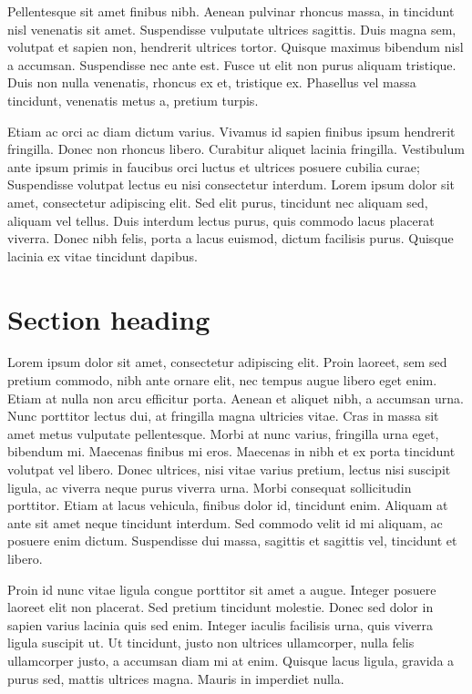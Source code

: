 \documentclass[a4paper, 11pt]{report}
\begin{document}
Pellentesque sit amet finibus nibh. Aenean pulvinar rhoncus massa, in tincidunt nisl venenatis sit amet. Suspendisse vulputate ultrices sagittis. Duis magna sem, volutpat et sapien non, hendrerit ultrices tortor. Quisque maximus bibendum nisl a accumsan. Suspendisse nec ante est. Fusce ut elit non purus aliquam tristique. Duis non nulla venenatis, rhoncus ex et, tristique ex. Phasellus vel massa tincidunt, venenatis metus a, pretium turpis.

Etiam ac orci ac diam dictum varius. Vivamus id sapien finibus ipsum hendrerit fringilla. Donec non rhoncus libero. Curabitur aliquet lacinia fringilla. Vestibulum ante ipsum primis in faucibus orci luctus et ultrices posuere cubilia curae; Suspendisse volutpat lectus eu nisi consectetur interdum. Lorem ipsum dolor sit amet, consectetur adipiscing elit. Sed elit purus, tincidunt nec aliquam sed, aliquam vel tellus. Duis interdum lectus purus, quis commodo lacus placerat viverra. Donec nibh felis, porta a lacus euismod, dictum facilisis purus. Quisque lacinia ex vitae tincidunt dapibus.

\section{Section heading}

Lorem ipsum dolor sit amet, consectetur adipiscing elit. Proin laoreet, sem sed pretium commodo, nibh ante ornare elit, nec tempus augue libero eget enim. Etiam at nulla non arcu efficitur porta. Aenean et aliquet nibh, a accumsan urna. Nunc porttitor lectus dui, at fringilla magna ultricies vitae. Cras in massa sit amet metus vulputate pellentesque. Morbi at nunc varius, fringilla urna eget, bibendum mi. Maecenas finibus mi eros. Maecenas in nibh et ex porta tincidunt volutpat vel libero. Donec ultrices, nisi vitae varius pretium, lectus nisi suscipit ligula, ac viverra neque purus viverra urna. Morbi consequat sollicitudin porttitor. Etiam at lacus vehicula, finibus dolor id, tincidunt enim. Aliquam at ante sit amet neque tincidunt interdum. Sed commodo velit id mi aliquam, ac posuere enim dictum. Suspendisse dui massa, sagittis et sagittis vel, tincidunt et libero.

Proin id nunc vitae ligula congue porttitor sit amet a augue. Integer posuere laoreet elit non placerat. Sed pretium tincidunt molestie. Donec sed dolor in sapien varius lacinia quis sed enim. Integer iaculis facilisis urna, quis viverra ligula suscipit ut. Ut tincidunt, justo non ultrices ullamcorper, nulla felis ullamcorper justo, a accumsan diam mi at enim. Quisque lacus ligula, gravida a purus sed, mattis ultrices magna. Mauris in imperdiet nulla.
\end{document}
